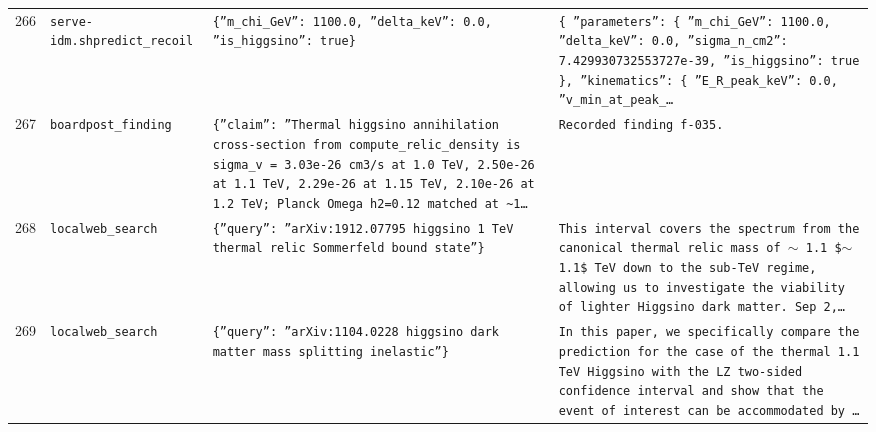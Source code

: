 \documentclass[11pt,a4paper]{article}
\begin{document}
\begin{longtable}{@{}p{}p{}p{}p{}@{}}
266 & \texttt{serve-idm.sh}\newline\texttt{predict\_\allowbreak{}recoil} & \texttt{\{''m\_\allowbreak{}chi\_\allowbreak{}GeV'':\allowbreak{} 1100.0,\allowbreak{} ''delta\_\allowbreak{}keV'':\allowbreak{} 0.0,\allowbreak{} ''is\_\allowbreak{}higgsino'':\allowbreak{} true\}\allowbreak{}} & \texttt{\{   ''parameters'':\allowbreak{} \{     ''m\_\allowbreak{}chi\_\allowbreak{}GeV'':\allowbreak{} 1100.0,\allowbreak{}     ''delta\_\allowbreak{}keV'':\allowbreak{} 0.0,\allowbreak{}     ''sigma\_\allowbreak{}n\_\allowbreak{}cm2'':\allowbreak{} 7.429930732553727e-39,\allowbreak{}     ''is\_\allowbreak{}higgsino'':\allowbreak{} true   \}\allowbreak{},\allowbreak{}   ''kinematics'':\allowbreak{} \{     ''E\_\allowbreak{}R\_\allowbreak{}peak\_\allowbreak{}keV'':\allowbreak{} 0.0,\allowbreak{}     ''v\_\allowbreak{}min\_\allowbreak{}at\_\allowbreak{}peak\_\allowbreak{}\ldots{}\allowbreak{}} \\
267 & \texttt{board}\newline\texttt{post\_\allowbreak{}finding} & \texttt{\{''claim'':\allowbreak{} ''Thermal higgsino annihilation cross-section from compute\_\allowbreak{}relic\_\allowbreak{}density is sigma\_\allowbreak{}v =\allowbreak{} 3.03e-26 cm3/\allowbreak{}s at 1.0 TeV,\allowbreak{} 2.50e-26 at 1.1 TeV,\allowbreak{} 2.29e-26 at 1.15 TeV,\allowbreak{} 2.10e-26 at 1.2 TeV;\allowbreak{} Planck Omega h2=\allowbreak{}0.12 matched at \textasciitilde{}\allowbreak{}1\ldots{}\allowbreak{}} & \texttt{Recorded finding f-035.} \\
268 & \texttt{local}\newline\texttt{web\_\allowbreak{}search} & \texttt{\{''query'':\allowbreak{} ''arXiv:\allowbreak{}1912.07795 higgsino 1 TeV thermal relic Sommerfeld bound state''\}\allowbreak{}} & \texttt{This interval covers the spectrum from the canonical thermal relic mass of $\sim$ 1.1 \$$\sim$1.1\$ TeV down to the sub-TeV regime,\allowbreak{} allowing us to investigate the viability of lighter Higgsino dark matter. Sep 2,\allowbreak{}\ldots{}\allowbreak{}} \\
269 & \texttt{local}\newline\texttt{web\_\allowbreak{}search} & \texttt{\{''query'':\allowbreak{} ''arXiv:\allowbreak{}1104.0228 higgsino dark matter mass splitting inelastic''\}\allowbreak{}} & \texttt{In this paper,\allowbreak{} we specifically compare the prediction for the case of the thermal 1.1 TeV Higgsino with the LZ two-sided confidence interval and show that the event of interest can be accommodated by \ldots{}\allowbreak{}} \\

\end{longtable}
\end{document}
